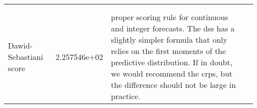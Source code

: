 \begin{sidewaystable}[]
\begin{tabularx}{\linewidth}{|X|X|X|X|}
\begin{tabular}[c]{@{}l@{}}DSS\\ \\ Dawid-Sebastiani score\end{tabular} & 2.257546e+02                                                                                                                                                                                                                                                                                                                                                                                                                                                                                                                                                                                                                                                                                                                                                                                                                                                                                                    & proper scoring rule for continuous and integer forecasts. The dss has a slightly simpler formula that only relies on the first moments of the predictive distribution. If in doubt, we would recommend the crps, but the difference should not be large in practice.                                                                                                                                                                           &                                                                                                                                                                \\

\end{tabularx}
\end{sidewaystable}
